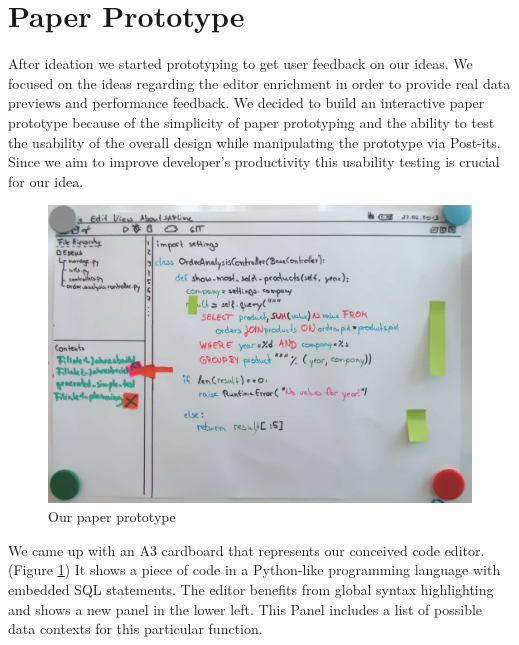 
\section{Paper Prototype}
\label{sec:PAPER_PROTOTYPE}

After ideation we started prototyping to get user feedback on our ideas. 
We focused on the ideas regarding the editor enrichment in order to provide real data previews and performance feedback.
We decided to build an interactive paper prototype because of the simplicity of paper prototyping and the ability to test the usability of the overall design while manipulating the prototype via Post-its.
Since we aim to improve developer's productivity this usability testing is crucial for our idea.

\begin{figure}
\begin{centering}
    \includegraphics[width=1.0\linewidth]{images/paper_prototype1}
    \caption{Our paper prototype}
    \label{fig:paper_prototype1}
\end{centering}
\end{figure}

We came up with an A3 cardboard that represents our conceived code editor. (Figure \ref{fig:paper_prototype1})
It shows a piece of code in a Python-like programming language with embedded SQL statements.
The editor benefits from global syntax highlighting and shows a new panel in the lower left.
This Panel includes a list of possible data contexts for this particular function.

